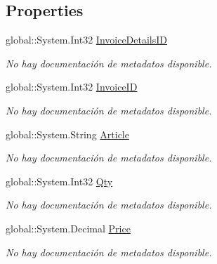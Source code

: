 \subsection*{Properties}
\begin{DoxyCompactItemize}
\item 
global\-::\-System.\-Int32 \hyperlink{class_game_memory_1_1_invoice_details_aca50c426114254633fd034bc5a64854d}{Invoice\-Details\-I\-D}
\begin{DoxyCompactList}\small\item\em No hay documentación de metadatos disponible. \end{DoxyCompactList}\item 
global\-::\-System.\-Int32 \hyperlink{class_game_memory_1_1_invoice_details_a67999662697ed10076327e47bba74611}{Invoice\-I\-D}
\begin{DoxyCompactList}\small\item\em No hay documentación de metadatos disponible. \end{DoxyCompactList}\item 
global\-::\-System.\-String \hyperlink{class_game_memory_1_1_invoice_details_abc5eef71cea2b1720b5b0179ddf6fbf8}{Article}
\begin{DoxyCompactList}\small\item\em No hay documentación de metadatos disponible. \end{DoxyCompactList}\item 
global\-::\-System.\-Int32 \hyperlink{class_game_memory_1_1_invoice_details_a8b4d80acf70dd427b45bb37590705813}{Qty}
\begin{DoxyCompactList}\small\item\em No hay documentación de metadatos disponible. \end{DoxyCompactList}\item 
global\-::\-System.\-Decimal \hyperlink{class_game_memory_1_1_invoice_details_a4022db9ebe3d673e24f09290d966ff5e}{Price}
\begin{DoxyCompactList}\small\item\em No hay documentación de metadatos disponible. \end{DoxyCompactList}\item 

\end{DoxyCompactItemize}
